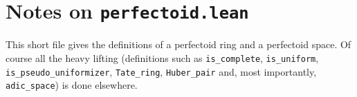 \documentclass{amsart}
\theoremstyle{plain}
\theoremstyle{remark}
\begin{document}
\section{Notes on {\tt perfectoid.lean}}

This short file gives the definitions of a perfectoid ring and a perfectoid space. Of course all the heavy lifting (definitions such as {\tt is\_complete}, {\tt is\_uniform}, {\tt is\_pseudo\_uniformizer}, {\tt Tate\_ring}, {\tt Huber\_pair} and, most importantly, {\tt adic\_space}) is done elsewhere.
\end{document}
